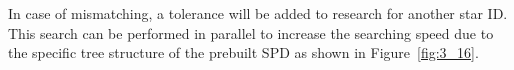 
\noindent In case of mismatching, a tolerance will be added to research for another star ID. This search can be performed in parallel to increase the searching speed due to the specific tree structure of the prebuilt SPD as shown in Figure~\ref{fig:3_16}.


